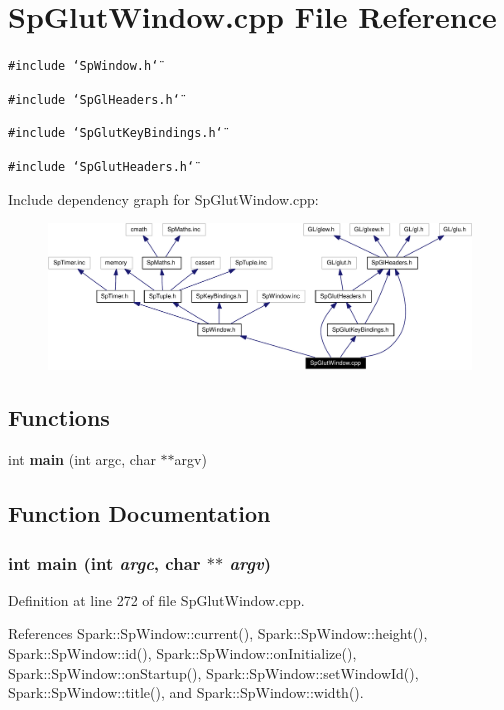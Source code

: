 \section{Sp\-Glut\-Window.cpp File Reference}
\label{SpGlutWindow_8cpp}
{\tt \#include \char`\"{}Sp\-Window.h\char`\"{}}\par
{\tt \#include \char`\"{}Sp\-Gl\-Headers.h\char`\"{}}\par
{\tt \#include \char`\"{}Sp\-Glut\-Key\-Bindings.h\char`\"{}}\par
{\tt \#include \char`\"{}Sp\-Glut\-Headers.h\char`\"{}}\par


Include dependency graph for Sp\-Glut\-Window.cpp:\begin{figure}[H]
\begin{center}
\leavevmode
\includegraphics[width=374pt]{SpGlutWindow_8cpp__incl}
\end{center}
\end{figure}
\subsection*{Functions}
\begin{CompactItemize}
\item 
int {\bf main} (int argc, char $\ast$$\ast$argv)
\end{CompactItemize}


\subsection{Function Documentation}
\subsubsection{\setlength{\rightskip}{0pt plus 5cm}int main (int {\em argc}, char $\ast$$\ast$ {\em argv})}\label{SpGlutWindow_8cpp_a13}


Definition at line 272 of file Sp\-Glut\-Window.cpp.

References Spark::Sp\-Window::current(), Spark::Sp\-Window::height(), Spark::Sp\-Window::id(), Spark::Sp\-Window::on\-Initialize(), Spark::Sp\-Window::on\-Startup(), Spark::Sp\-Window::set\-Window\-Id(), Spark::Sp\-Window::title(), and Spark::Sp\-Window::width().